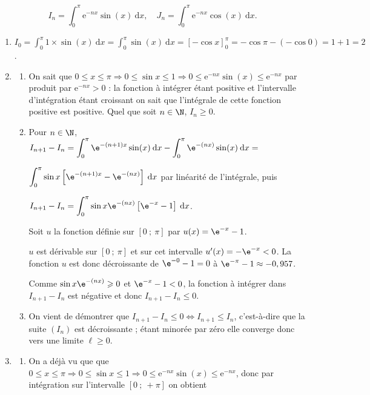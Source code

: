 
\medskip


\[I_n = \displaystyle\int_0^{\pi} \text{e}^{- nx}\sin (x)\:\text{d}x, \quad  J_n = \displaystyle\int_0^{\pi} \text{e}^{-nx}\cos (x)\:\text{d}x.\]

\medskip

\begin{enumerate}
\item %
$I_0 = \displaystyle\int_0^{\pi} 1 \times \sin (x)\:\text{d}x = \displaystyle\int_0^{\pi} \sin (x)\:\text{d}x  = [- \cos x]_0^{\pi} = - \cos \pi - (- \cos 0) = 1 + 1 = 2$.
\item 
	\begin{enumerate}
		\item %
On sait que $0 \leqslant x \leqslant  \pi \Rightarrow 0 \leqslant \sin x \leqslant 1 \Rightarrow 0 \leqslant \text{e}^{- nx}\sin (x) \leqslant \text{e}^{- nx}$ par produit par $\text{e}^{- nx} > 0$ : la fonction à intégrer étant positive et l'intervalle d'intégration étant croissant on sait que l'intégrale de cette fonction positive est positive. Quel que soit $n \in \N$,\: $I_n \geqslant 0$.
		\item %
Pour $n \in \N$, \: $I_{n+1} - I_n  = \displaystyle\int_0^{\pi} \e^{-(n+1)x} \sin (x)\:\text{d}x - \displaystyle\int_0^{\pi} \e^{-(nx)} \sin (x)\:\text{d}x = $

$\displaystyle\int_0^{\pi}\sin x\left[\e^{-(n+1)x}  - \e^{-(nx)} \right]\:\text{d}x$ par linéarité de l'intégrale, puis 

$I_{n+1} - I_n  = \displaystyle\int_0^{\pi} \sin x  \e^{-(nx)}\left[\e^{- x} - 1\right]\:\text{d}x$.

Soit $u$ la fonction définie sur $[0~;~\pi]$ par $u(x) = \e^{- x} - 1$.

$u$ est dérivable sur $[0~;~\pi]$ et sur cet intervalle $u'(x) = - \e^{-x} < 0$.
La fonction $u$ est donc décroissante de $\e^{-0} - 1 = 0$ à $\e^{- \pi} - 1 \approx -0,957$.

Comme $\sin x  \e^{-(nx)} \geqslant 0$ et $\e^{- x} - 1 < 0$, la fonction à intégrer dans $I_{n+1} - I_n$ est négative et donc $I_{n+1} - I_n \leqslant 0$.
		\item %
On vient de démontrer que $I_{n+1} - I_n \leqslant 0 \iff I_{n+1} \leqslant I_n $, c'est-à-dire que la suite $\left(I_n\right)$ est décroissante ; étant minorée par zéro elle converge donc vers une limite $\ell \geqslant 0$.
	\end{enumerate}
\item
	\begin{enumerate}
		\item %
On a déjà vu que  que $0 \leqslant x \leqslant \pi \Rightarrow 0 \leqslant \sin x \leqslant 1 \Rightarrow 0 \leqslant \text{e}^{- nx}\sin (x) \leqslant \text{e}^{- nx}$, donc par intégration sur l'intervalle $[0~;~+ \pi]$ on obtient 
		

\end{enumerate}
\end{enumerate}
